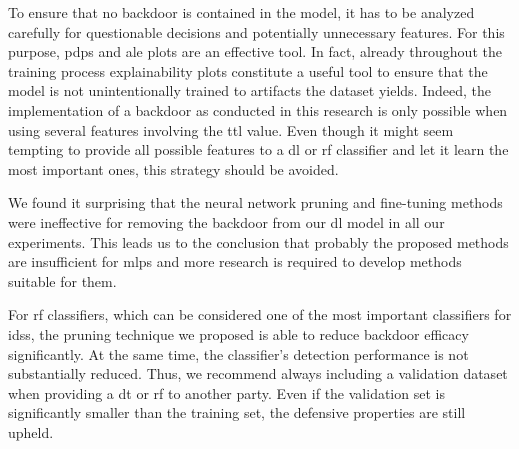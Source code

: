 \documentclass[10pt,sigconf,letterpaper,dvipsnames]{acmart}
\begin{document}
To ensure that no backdoor is contained in the model,
it has to be  analyzed carefully for questionable decisions and potentially unnecessary features. For this purpose, \glspl{pdp} and \gls{ale} plots are an effective tool. In fact, already throughout the training process explainability plots constitute a useful tool to ensure that the model is not unintentionally trained  to artifacts the dataset yields.
Indeed, the implementation of a backdoor as conducted in this research is only possible when using several features involving the \gls{ttl} value. Even though it might seem tempting to provide all possible features to a \gls{dl} or \gls{rf} classifier and let it learn the most important ones, this strategy should be avoided.

We found it surprising that the neural network pruning and fine-tuning methods were ineffective for removing the backdoor from our \gls{dl} model in all our experiments. This leads us to the conclusion that probably the proposed methods are insufficient for \glspl{mlp} and more research is required to develop methods suitable for them.

For \gls{rf} classifiers, which can be considered one of the most important classifiers for \glspl{ids}, the pruning technique we proposed is able to reduce backdoor efficacy significantly. At the same time, the classifier's detection performance is not substantially reduced. Thus, we recommend always including a validation dataset when providing a \gls{dt} or \gls{rf} to another party. Even if the validation set is significantly smaller than the training set, the defensive properties are still upheld. 

%
%
%
\end{document}
